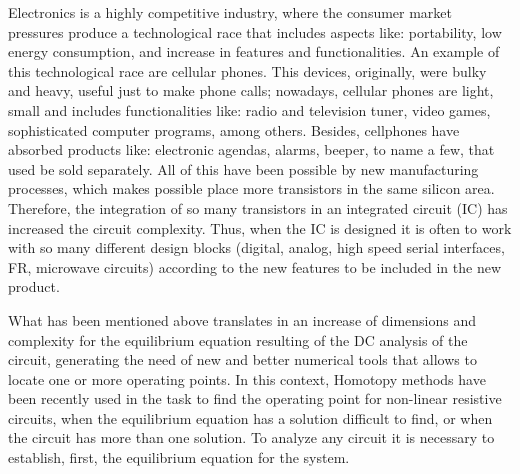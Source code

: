 \documentclass[conference,letterpaper,onecolumn,11pt]{IEEEtran}
\begin{document}
Electronics is a highly competitive industry, where the consumer market pressures produce a technological race that includes aspects like: portability, low energy consumption, and increase in features and functionalities. An example of this technological race are cellular phones. This devices, originally,  were bulky and heavy, useful just to make phone calls; nowadays, cellular phones are light, small and includes functionalities like: radio and television tuner, video games, sophisticated computer programs, among others. Besides, cellphones have absorbed products like: electronic agendas, alarms, beeper, to name a few, that used be sold separately. All of this have been possible by new manufacturing processes, which makes possible place more transistors in the same silicon area. Therefore, the integration of so many transistors in an integrated circuit (IC) has increased the circuit complexity. Thus, when the IC is designed it is often to work with so many different design blocks (digital, analog, high speed serial interfaces, FR, microwave circuits) according to the new features to be included in the new product.

What has been mentioned above translates in an increase of dimensions and complexity for the equilibrium equation resulting of the DC analysis of the circuit, generating the need of new and better numerical tools that allows to locate one or more operating points. In this context, Homotopy methods \cite{stat_1} have been recently used in the task to find the operating point for non-linear resistive circuits, when the equilibrium equation has a solution difficult to find, or when the circuit has more than one solution. To analyze any circuit it is necessary to establish, first, the equilibrium equation for the system.
\end{document}

